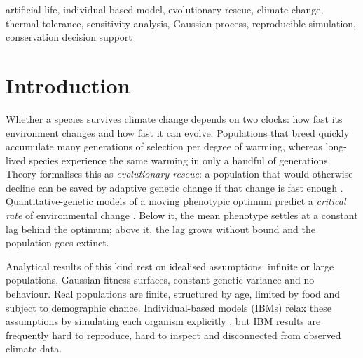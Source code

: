 \documentclass[conference]{IEEEtran}
\begin{document}
\begin{IEEEkeywords}
artificial life, individual-based model, evolutionary rescue, climate change,
thermal tolerance, sensitivity analysis, Gaussian process, reproducible simulation,
conservation decision support
\end{IEEEkeywords}

\section{Introduction}
Whether a species survives climate change depends on two clocks: how fast its
environment changes and how fast it can evolve. Populations that breed quickly
accumulate many generations of selection per degree of warming, whereas
long-lived species experience the same warming in only a handful of generations.
Theory formalises this as \emph{evolutionary rescue}: a population that would
otherwise decline can be saved by adaptive genetic change if that change is
fast enough \cite{gomulkiewicz1995,bell2009}. Quantitative-genetic models of a
moving phenotypic optimum predict a \emph{critical rate} of environmental change
\cite{lynch1993,burger1995,chevin2010}. Below it, the mean phenotype settles at a
constant lag behind the optimum; above it, the lag grows without bound and the
population goes extinct.

Analytical results of this kind rest on idealised assumptions: infinite or large
populations, Gaussian fitness surfaces, constant genetic variance and no
behaviour. Real populations are finite, structured by age, limited by food and
subject to demographic chance. Individual-based models (IBMs) relax these
assumptions by simulating each organism explicitly \cite{deangelis2014,grimm2006},
but IBM results are frequently hard to reproduce, hard to inspect and disconnected
from observed climate data.
\end{document}
